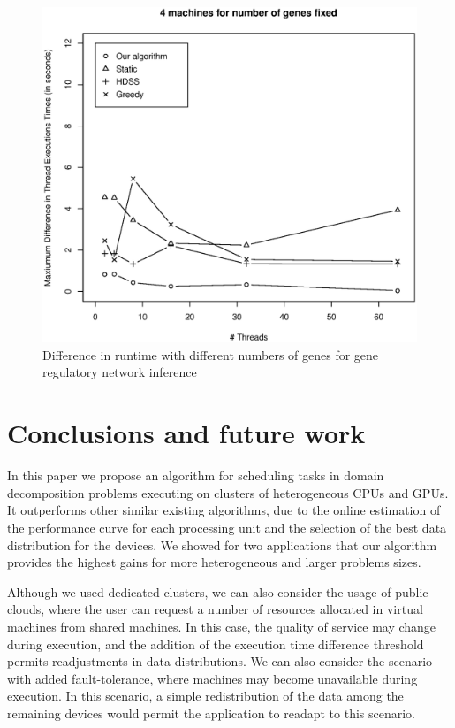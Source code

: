 \documentclass[journal]{IEEEtran}
\begin{document}
\begin{figure}[htb]
	\begin{center}
	\centering
			\includegraphics[scale=0.4]{Maxima_Diferenca_Fabrizio.eps}
	\caption{Difference in runtime with different numbers of genes for gene regulatory network inference}
	\label{fig:GeneDiferenca}
	\end{center}
\end{figure}


\section{Conclusions and future work}

In this paper we propose an algorithm for scheduling tasks in domain
decomposition problems executing on clusters of heterogeneous CPUs and GPUs. It
outperforms other similar existing algorithms, due to the online estimation of
the performance curve for each processing unit and the selection of the best
data distribution for the devices. We showed for two applications that our
algorithm provides the highest gains for more heterogeneous and larger problems
sizes.

Although we used dedicated clusters, we can also consider the usage of public
clouds, where the user can request a number of resources allocated in virtual
machines from shared machines. In this case, the quality of service may change
during execution, and the addition of the execution time difference threshold
permits readjustments in data distributions. We can also consider the scenario
with added fault-tolerance, where machines may become unavailable during
execution. In this scenario, a simple redistribution of the data among the
remaining devices would permit the application to readapt to this scenario.
\end{document}
